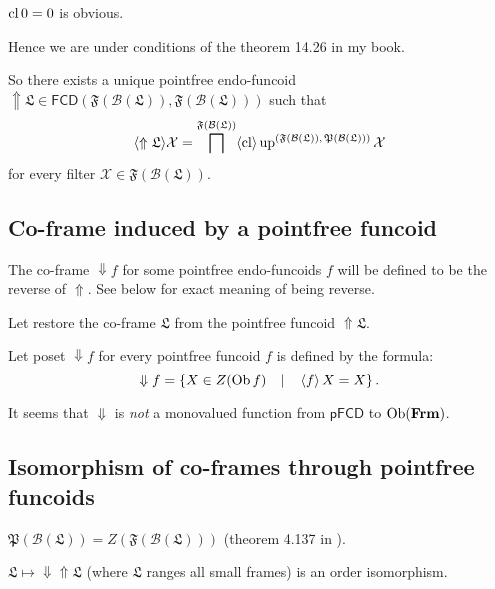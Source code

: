 $\operatorname{cl} 0 = 0$ is obvious.

Hence we are under conditions of the theorem 14.26 in my book.

So there exists a unique pointfree endo-funcoid $\Uparrow \mathfrak{L} \in
\mathsf{FCD} (\mathfrak{F} (\mathcal{B} (\mathfrak{L})) , \mathfrak{F}
(\mathcal{B} (\mathfrak{L})))$ such that
\[ \langle \Uparrow \mathfrak{L} \rangle \mathcal{X} = \bigsqcap^{\mathfrak{F}
   (\mathcal{B} (\mathfrak{L}))} \langle \operatorname{cl} \rangle
   \operatorname{up}^{\text{$(\mathfrak{F} (\mathcal{B} (\mathfrak{L})) , \mathfrak{P}
   (\mathcal{B} (\mathfrak{L})))$}}  \mathcal{X} \]
for every filter $\mathcal{X} \in \mathfrak{F} (\mathcal{B} (\mathfrak{L}))$.

\subsection{Co-frame induced by a pointfree funcoid}

The co-frame $\Downarrow f$ for some pointfree endo-funcoids $f$ will be
defined to be the reverse of $\Uparrow$. See below for exact meaning of being
reverse.

Let restore the co-frame $\mathfrak{L}$ from the pointfree funcoid $\Uparrow
\mathfrak{L}$.

Let poset $\Downarrow f$ for every pointfree funcoid $f$ is defined by the
formula:
\[ \Downarrow f = \left\{ X \in Z (\operatorname{Ob} f) \hspace{1em} | \hspace{1em}
   \left\langle f\right\rangle X = X \right\} . \]
\begin{rem}
  It seems that $\Downarrow$ is \emph{not} a monovalued function from
  $\mathsf{pFCD}$ to $\operatorname{Ob} (\mathbf{Frm})$.
\end{rem}

\subsection{Isomorphism of co-frames through pointfree funcoids}

\begin{rem}
  $\mathfrak{P} (\mathcal{B} (\mathfrak{L})) = Z (\mathfrak{F} (\mathcal{B}
  (\mathfrak{L})))$ (theorem 4.137 in {\cite{volume-1}}).
\end{rem}

\begin{thm}
  $\mathfrak{L} \mapsto \Downarrow \Uparrow \mathfrak{L}$ (where
  $\mathfrak{L}$ ranges all small frames) is an order isomorphism.
\end{thm}

